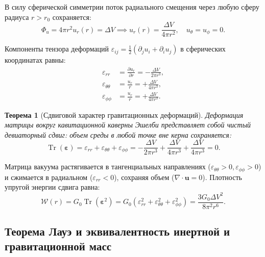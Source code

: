 \documentclass[11pt,a4paper]{article}
\newtheorem{theorem}{Теорема}
\theoremstyle{definition}
\theoremstyle{remark}
\begin{document}
В силу сферической симметрии поток радиального смещения через любую сферу радиуса $r > r_0$ сохраняется:
\begin{equation}
	\Phi_u = 4\pi r^2 u_r(r) = \Delta V \implies u_r(r) = \frac{\Delta V}{4\pi r^2}, \quad u_\theta = u_\phi = 0.
	\label{eq:radial_displacement_eshelby}
\end{equation}

Компоненты тензора деформаций $\varepsilon_{ij} = \frac{1}{2}(\partial_j u_i + \partial_i u_j)$ в сферических координатах равны:
\begin{align}
	\varepsilon_{rr} &= \frac{\partial u_r}{\partial r} = -\frac{\Delta V}{2\pi r^3}, \label{eq:strain_rr} \\
	\varepsilon_{\theta\theta} &= \frac{u_r}{r} = +\frac{\Delta V}{4\pi r^3}, \label{eq:strain_theta} \\
	\varepsilon_{\phi\phi} &= \frac{u_r}{r} = +\frac{\Delta V}{4\pi r^3}. \label{eq:strain_phi}
\end{align}

\begin{theorem}[Сдвиговой характер гравитационных деформаций]
\label{thm:eshelby_pure_shear}
Деформация матрицы вокруг кавитационной каверны Эшелби представляет собой чистый девиаторный сдвиг: объем среды в любой точке вне керна сохраняется:
\begin{equation}
	\operatorname{Tr}(\boldsymbol{\varepsilon}) = \varepsilon_{rr} + \varepsilon_{\theta\theta} + \varepsilon_{\phi\phi} = -\frac{\Delta V}{2\pi r^3} + \frac{\Delta V}{4\pi r^3} + \frac{\Delta V}{4\pi r^3} = 0.
	\label{eq:eshelby_trace_zero}
\end{equation}
\end{theorem}
Матрица вакуума растягивается в тангенциальных направлениях ($\varepsilon_{\theta\theta} > 0, \varepsilon_{\phi\phi} > 0$) и сжимается в радиальном ($\varepsilon_{rr} < 0$), сохраняя объем ($\nabla \cdot \mathbf{u} = 0$). Плотность упругой энергии сдвига равна:
\begin{equation}
	\mathcal{W}(r) = G_0 \operatorname{Tr}(\boldsymbol{\varepsilon}^2) = G_0 \left( \varepsilon_{rr}^2 + \varepsilon_{\theta\theta}^2 + \varepsilon_{\phi\phi}^2 \right) = \frac{3 G_0 \Delta V^2}{8\pi^2 r^6}.
	\label{eq:eshelby_energy_density}
\end{equation}

\subsection{Теорема Лауэ и эквивалентность инертной и гравитационной масс}
\end{document}
